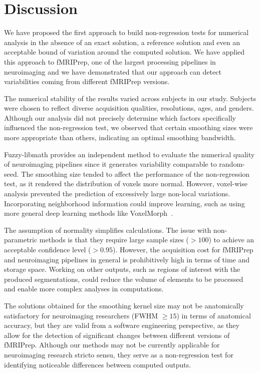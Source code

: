 \documentclass{article}
\newcommand{\fmriprep}{fMRIPrep\xspace}
\begin{document}
\section{Discussion}


We have proposed the first approach to build non-regression tests for numerical analysis in the absence of an exact solution, a reference solution and even an acceptable bound of variation around the computed solution. We have applied this approach to \fmriprep, one of the largest processing pipelines in neuroimaging and we have demonstrated that our approach can detect variabilities coming from different \fmriprep versions.

The numerical stability of the results varied across subjects in our study. Subjects were chosen to reflect diverse acquisition qualities, resolutions, ages, and genders. Although our analysis did not precisely determine which factors specifically influenced the non-regression test, we observed that certain smoothing sizes were more appropriate than others, indicating an optimal smoothing bandwidth.

Fuzzy-libmath provides an independent method to evaluate the numerical quality of neuroimaging pipelines since it generates variability comparable to random-seed. The smoothing size tended to affect the performance of the non-regression test, as it rendered the distribution of voxels more normal. However, voxel-wise analysis prevented the prediction of excessively large non-local variations. Incorporating neighborhood information could improve learning, such as using more general deep learning methods like VoxelMorph~\cite{balakrishnan2019voxelmorph}.

The assumption of normality simplifies calculations. The issue with non-parametric methods is that they require large sample sizes ($>100$) to achieve an acceptable confidence level ($>0.95$). However, the acquisition cost for \fmriprep and neuroimaging pipelines in general is prohibitively high in terms of time and storage space. Working on other outputs, such as regions of interest with the produced segmentations, could reduce the volume of elements to be processed and enable more complex analyses in computations.

The solutions obtained for the smoothing kernel size may not be anatomically satisfactory for neuroimaging researchers (FWHM $\geq 15$) in terms of anatomical accuracy, but they are valid from a software engineering perspective, as they allow for the detection of significant changes between different versions of \fmriprep. Although our methods may not be currently applicable for neuroimaging research stricto sensu, they serve as a non-regression test for identifying noticeable differences between computed outputs.
\end{document}
